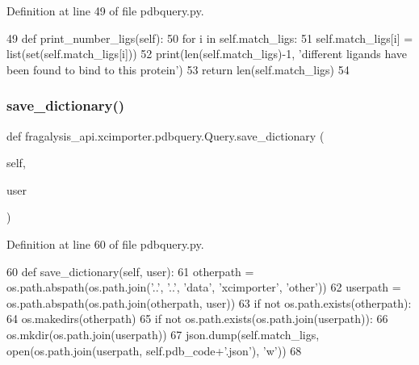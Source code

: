 Definition at line 49 of file pdbquery.\+py.


\begin{DoxyCode}
49     \textcolor{keyword}{def }print\_number\_ligs(self):
50         \textcolor{keywordflow}{for} i \textcolor{keywordflow}{in} self.match\_ligs:
51             self.match\_ligs[i] = list(set(self.match\_ligs[i]))
52         print(len(self.match\_ligs)-1, \textcolor{stringliteral}{'different ligands have been found to bind to this protein'})
53         \textcolor{keywordflow}{return} len(self.match\_ligs)
54 
\end{DoxyCode}
\mbox{\label{classfragalysis__api_1_1xcimporter_1_1pdbquery_1_1_query_a42babe6a340aaf0b2dcc84ea5d0c0b11}} 
\subsubsection{\texorpdfstring{save\+\_\+dictionary()}{save\_dictionary()}}
{\footnotesize\ttfamily def fragalysis\+\_\+api.\+xcimporter.\+pdbquery.\+Query.\+save\+\_\+dictionary (\begin{DoxyParamCaption}\item[{}]{self,  }\item[{}]{user }\end{DoxyParamCaption})}



Definition at line 60 of file pdbquery.\+py.


\begin{DoxyCode}
60     \textcolor{keyword}{def }save\_dictionary(self, user):
61         otherpath = os.path.abspath(os.path.join(\textcolor{stringliteral}{'..'}, \textcolor{stringliteral}{'..'}, \textcolor{stringliteral}{'data'}, \textcolor{stringliteral}{'xcimporter'}, \textcolor{stringliteral}{'other'}))
62         userpath = os.path.abspath(os.path.join(otherpath, user))
63         \textcolor{keywordflow}{if} \textcolor{keywordflow}{not} os.path.exists(otherpath):
64             os.makedirs(otherpath)
65         \textcolor{keywordflow}{if} \textcolor{keywordflow}{not} os.path.exists(os.path.join(userpath)):
66             os.mkdir(os.path.join(userpath))
67         json.dump(self.match\_ligs, open(os.path.join(userpath, self.pdb\_code+\textcolor{stringliteral}{'.json'}), \textcolor{stringliteral}{'w'}))
68 
\end{DoxyCode}
\mbox{\label{classfragalysis__api_1_1xcimporter_1_1pdbquery_1_1_query_ada4ce4d98d911a33baabe42bf38a4aa1}} 
